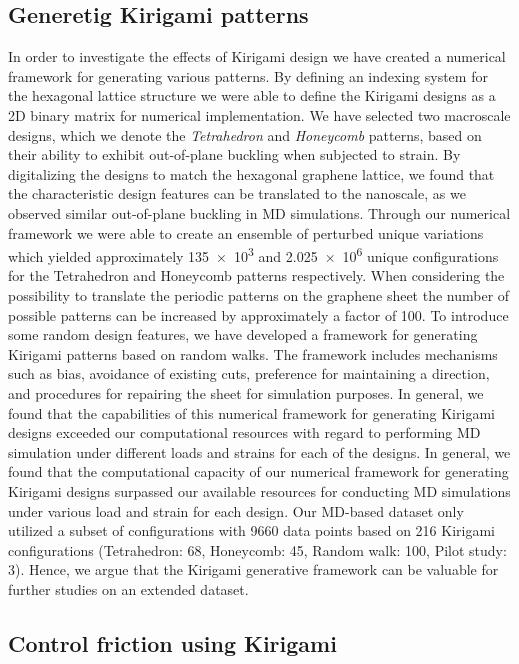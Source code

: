 \subsection{Generetig Kirigami patterns}
In order to investigate the effects of Kirigami design we have created a
numerical framework for generating various patterns. By defining an indexing
system for the hexagonal lattice structure we were able to define the Kirigami
designs as a 2D binary matrix for numerical implementation. We have selected two
macroscale designs, which we denote the \textit{Tetrahedron} and
\textit{Honeycomb} patterns, based on their ability to exhibit
out-of-plane buckling when subjected to strain. By digitalizing the designs to
match the hexagonal graphene lattice, we found that the characteristic design
features can be translated to the nanoscale, as we observed similar out-of-plane
buckling in \acrshort{MD} simulations. Through our numerical framework we were
able to create an ensemble of perturbed unique variations which yielded
approximately \num{135e3} and \num{2.025e6} unique configurations for the
Tetrahedron and Honeycomb patterns respectively. When considering the
possibility to translate the periodic patterns on the graphene sheet the number of possible patterns can be increased by approximately a factor of 100. To introduce some random design features, we have developed a framework for generating Kirigami patterns based on random walks. The framework includes mechanisms such as bias, avoidance of existing cuts, preference for maintaining a direction, and procedures for repairing the sheet for simulation purposes. In general, we found that the
capabilities of this numerical framework for generating Kirigami designs exceeded
our computational resources with regard to performing \acrshort{MD} simulation
under different loads and strains for each of the designs. In general, we found that the computational capacity of our numerical framework for generating Kirigami designs surpassed our available resources for conducting  \acrshort{MD} simulations under various load and strain for each design. Our \acrshort{MD}-based dataset only utilized a subset of configurations with 9660 data points based on 216 Kirigami configurations (Tetrahedron: 68, Honeycomb:
45, Random walk: 100, Pilot study: 3). Hence, we argue that the Kirigami generative framework can be valuable for further studies on an extended dataset.


\subsection{Control friction using Kirigami}

